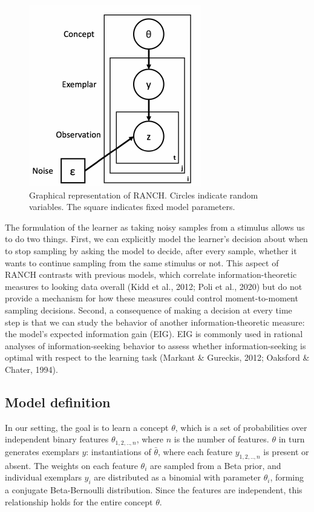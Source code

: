 \documentclass[
  man,floatsintext]{apa6}
\begin{document}
\begin{figure}[H]

{\centering \includegraphics{pokebaby_main_files/figure-latex/unnamed-chunk-11-1} 

}

\caption{Graphical representation of RANCH. Circles indicate random variables. The square indicates fixed model parameters.}\label{fig:unnamed-chunk-11}
\end{figure}

The formulation of the learner as taking noisy samples from a stimulus allows us to do two things. First, we can explicitly model the learner's decision about when to stop sampling by asking the model to decide, after every sample, whether it wants to continue sampling from the same stimulus or not. This aspect of RANCH contrasts with previous models, which correlate information-theoretic measures to looking data overall (Kidd et al., 2012; Poli et al., 2020) but do not provide a mechanism for how these measures could control moment-to-moment sampling decisions. Second, a consequence of making a decision at every time step is that we can study the behavior of another information-theoretic measure: the model's expected information gain (EIG). EIG is commonly used in rational analyses of information-seeking behavior to assess whether information-seeking is optimal with respect to the learning task (Markant \& Gureckis, 2012; Oaksford \& Chater, 1994).

\hypertarget{model-definition}{%
\subsection{Model definition}\label{model-definition}}

In our setting, the goal is to learn a concept \(\theta\), which is a set of probabilities over independent binary features \(\theta_{1,2,..,n}\), where \(n\) is the number of features. \(\theta\) in turn generates exemplars \(y\): instantiations of \(\bar{\theta}\), where each feature \(y_{1,2,..,n}\) is present or absent. The weights on each feature \(\theta_i\) are sampled from a Beta prior, and individual exemplars \(y_i\) are distributed as a binomial with parameter \(\theta_i\), forming a conjugate Beta-Bernoulli distribution. Since the features are independent, this relationship holds for the entire concept \(\theta\).
\end{document}
